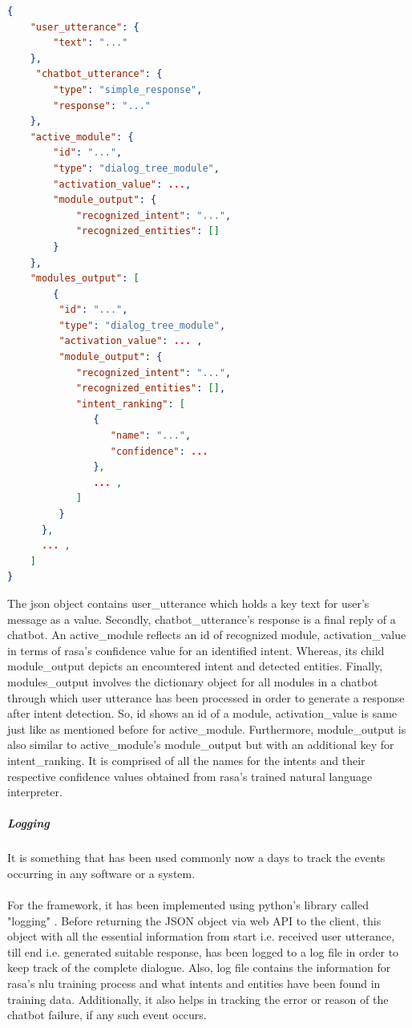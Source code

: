 \begin{lstlisting}[language=json, firstnumber=1]
{
    "user_utterance": {
        "text": "..."
    }, 
     "chatbot_utterance": {
        "type": "simple_response", 
        "response": "..."
    },
    "active_module": {
        "id": "...", 
        "type": "dialog_tree_module", 
        "activation_value": ..., 
        "module_output": {
            "recognized_intent": "...", 
            "recognized_entities": []
        }
    }, 
    "modules_output": [
        {
         "id": "...",
         "type": "dialog_tree_module",
         "activation_value": ... ,
         "module_output": {
            "recognized_intent": "...",
            "recognized_entities": [],
            "intent_ranking": [
               {
                  "name": "...",
                  "confidence": ...
               },
               ... ,
            ]
         }
      },
      ... ,
    ]
}
\end{lstlisting}
The json object contains user\_utterance which holds a key text for user's message as a value. Secondly, chatbot\_utterance's response is a final reply of a chatbot. An active\_module reflects an id of recognized module, activation\_value in terms of rasa's confidence value for an identified intent. Whereas, its child module\_output depicts an encountered intent and detected entities. Finally, modules\_output involves the dictionary object for all modules in a chatbot through which user utterance has been processed in order to generate a response after intent detection. So, id shows an id of a module, activation\_value is same just like as mentioned before for active\_module. Furthermore, module\_output is also similar to active\_module's module\_output but with an additional key for intent\_ranking. It is comprised of all the names for the intents and their respective confidence values obtained from rasa's trained natural language interpreter.

\subparagraph*{Logging}
It is something that has been used commonly now a days to track the events occurring in any software or a system. 
\\~\\
For the framework, it has been implemented using python's library called "logging" \cite{logging}. Before returning the JSON object via web API to the client, this object with all the essential information from start i.e. received user utterance, till end i.e. generated suitable response, has been logged to a log file in order to keep track of the complete dialogue. Also, log file contains the information for rasa's nlu training process and what intents and entities have been found in training data. Additionally, it also helps in tracking the error or reason of the chatbot failure, if any such event occurs.  


